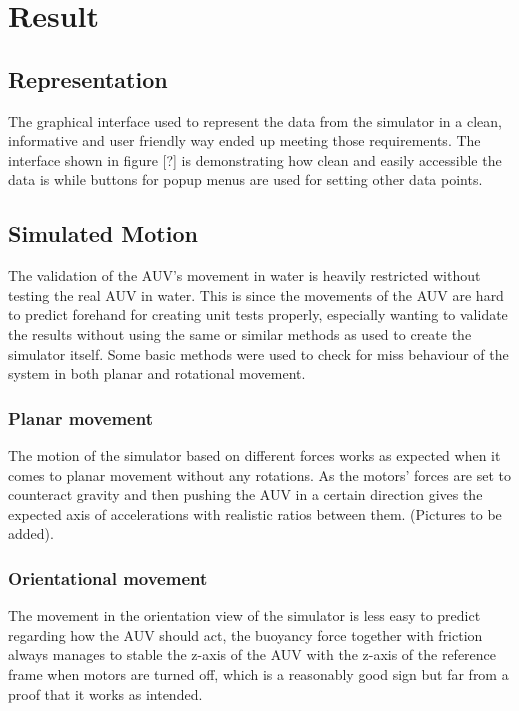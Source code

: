 \section{Result}\label{sec:result}

\subsection{Representation}
The graphical interface used to represent the data from the simulator in a clean, informative and user friendly way ended up meeting those requirements. The interface shown in figure [?] is demonstrating how clean and easily accessible the data is while buttons for popup menus are used for setting other data points.

\subsection{Simulated Motion}
The validation of the AUV's movement in water is heavily restricted without testing the real AUV in water. This is since the movements of the AUV are hard to predict forehand for creating unit tests properly, especially wanting to validate the results without using the same or similar methods as used to create the simulator itself. Some basic methods were used to check for miss behaviour of the system in both planar and rotational movement.
\subsubsection{Planar movement}
The motion of the simulator based on different forces works as expected when it comes to planar movement without any rotations. As the motors' forces are set to counteract gravity and then pushing the AUV in a certain direction gives the expected axis of accelerations with realistic ratios between them.  (Pictures to be added).
\subsubsection{Orientational movement}
The movement in the orientation view of the simulator is less easy to predict regarding how the AUV should act, the buoyancy force together with friction always manages to stable the z-axis of the AUV with the z-axis of the reference frame when motors are turned off, which is a reasonably good sign but far from a proof that it works as intended.

